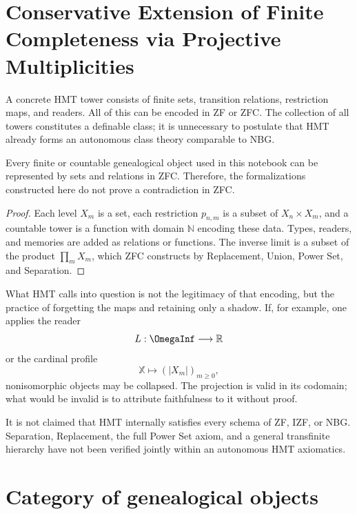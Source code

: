\label{chap:p3-83-45-completitud_finita}

\section{Conservative Extension of Finite Completeness via Projective Multiplicities}

A concrete HMT tower consists of finite sets, transition relations,
restriction maps, and readers. All of this can be
encoded in ZF or ZFC. The collection of all towers constitutes a
definable class; it is unnecessary to postulate that HMT already forms an
autonomous class theory comparable to NBG.

\begin{proposition}
Every finite or countable genealogical object used in this notebook can
be represented by sets and relations in ZFC. Therefore, the
formalizations constructed here do not prove a contradiction in ZFC.
\end{proposition}

\begin{proof}
Each level \(X_m\) is a set, each restriction \(p_{n,m}\) is a
subset of \(X_n\times X_m\), and a countable tower is a function with
domain \(\mathbb N\) encoding these data. Types, readers, and memories
are added as relations or functions. The inverse limit is a subset
of the product \(\prod_mX_m\), which ZFC constructs by Replacement, Union,
Power Set, and Separation.
\end{proof}

What HMT calls into question is not the legitimacy of that encoding, but the practice
of forgetting the maps and retaining only a shadow. If, for example, one applies
the reader
\[
  L:\OmegaInf\longrightarrow\mathbb R
\]
or the cardinal profile
\[
  \mathbb X\longmapsto(|X_m|)_{m\ge0},
\]
nonisomorphic objects may be collapsed. The projection is valid in its
codomain; what would be invalid is to attribute faithfulness to it without proof.

\begin{remark}
It is not claimed that HMT internally satisfies every schema of ZF, IZF, or
NBG. Separation, Replacement, the full Power Set axiom, and a general transfinite
hierarchy have not been verified jointly within an autonomous HMT axiomatics.
\end{remark}

\section{Category of genealogical objects}

